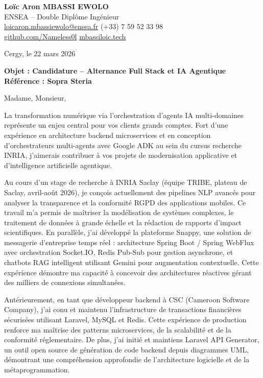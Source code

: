 \documentclass[a4paper,11pt]{article}
\begin{document}
\noindent
\textbf{Lo\"ic Aron MBASSI EWOLO} \\
ENSEA -- Double Dipl\^ome Ing\'enieur \\
\href{mailto:loicaron.mbassiewolo@ensea.fr}{loicaron.mbassiewolo@ensea.fr} \quad (+33) 7 59 52 33 98 \\
\href{https://github.com/Nameless0l}{github.com/Nameless0l} \quad \href{https://mbassiloic.tech}{mbassiloic.tech}

\vspace{1em}
\noindent Cergy, le 22 mars 2026

\vspace{1em}
\noindent
\textbf{Objet : Candidature -- Alternance Full Stack et IA Agentique} \\
\textbf{R\'ef\'erence : Sopra Steria}

\vspace{1.5em}
\noindent Madame, Monsieur,

La transformation num\'erique via l'orchestration d'agents IA multi-domaines repr\'esente un enjeu central pour vos clients grands comptes. Fort d'une exp\'erience en architecture backend microservices et en conception d'orchestrateurs multi-agents avec Google ADK au sein du cursus recherche INRIA, j'aimerais contribuer \`a vos projets de modernisation applicative et d'intelligence artificielle agentique.

\vspace{0.8em}

Au cours d'un stage de recherche \`a INRIA Saclay (\'equipe TRIBE, plateau de Saclay, avril-ao\^ut 2026), je con\c{c}ois actuellement des pipelines NLP avanc\'es pour analyser la transparence et la conformit\'e RGPD des applications mobiles. Ce travail m'a permis de ma\^itriser la mod\'elisation de syst\`emes complexes, le traitement de donn\'ees \`a grande \'echelle et la rédaction de rapports d'impact scientifiques. En parallèle, j'ai d\'evelopp\'e la plateforme Snappy, une solution de messagerie d'entreprise temps r\'eel : architecture Spring Boot / Spring WebFlux avec orchestration Socket.IO, Redis Pub-Sub pour gestion asynchrone, et chatbots RAG intelligent utilisant Gemini pour augmentation contextuelle. Cette exp\'erience d\'emontre ma capacit\'e \`a concevoir des architectures r\'eactives g\'erant des milliers de connexions simultan\'ees.

\vspace{0.8em}

Antérieurement, en tant que d\'eveloppeur backend \`a CSC (Cameroon Software Company), j'ai conu et maintenu l'infrastructure de transactions financi\`eres s\'ecuris\'ees utilisant Laravel, MySQL et Redis. Cette exp\'erience de production renforce ma ma\^itrise des patterns microservices, de la scalabilit\'e et de la conformit\'e r\'eglementaire. De plus, j'ai initié et maintiens Laravel API Generator, un outil open source de g\'en\'eration de code backend depuis diagrammes UML, d\'emontrant une compr\'ehension approfondie de l'architecture logicielle et de la m\'etaprogrammation.
\end{document}
